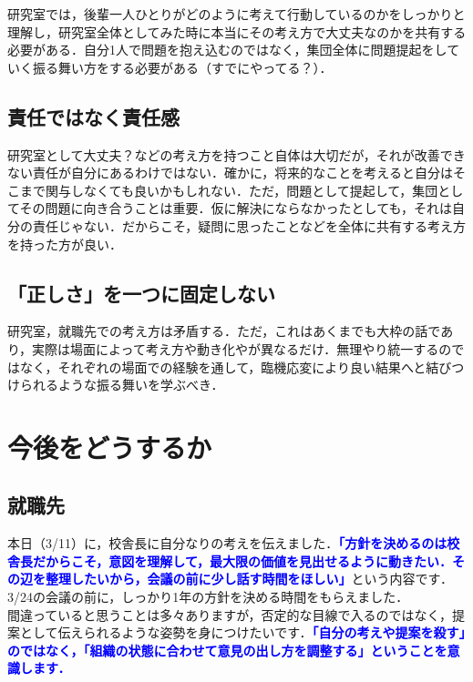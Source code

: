 \documentclass[a4paper,12pt]{ltjsarticle}
\newcommand{\important}[1]{\textcolor{blue}{\textbf{#1}}}
\begin{document}
研究室では，後輩一人ひとりがどのように考えて行動しているのかをしっかりと理解し，研究室全体としてみた時に本当にその考え方で大丈夫なのかを共有する必要がある．自分1人で問題を抱え込むのではなく，集団全体に問題提起をしていく振る舞い方をする必要がある（すでにやってる？）．

\subsection{責任ではなく責任感}

研究室として大丈夫？などの考え方を持つこと自体は大切だが，それが改善できない責任が自分にあるわけではない．確かに，将来的なことを考えると自分はそこまで関与しなくても良いかもしれない．ただ，問題として提起して，集団としてその問題に向き合うことは重要．仮に解決にならなかったとしても，それは自分の責任じゃない．だからこそ，疑問に思ったことなどを全体に共有する考え方を持った方が良い．

\subsection{「正しさ」を一つに固定しない}

研究室，就職先での考え方は矛盾する．ただ，これはあくまでも大枠の話であり，実際は場面によって考え方や動き化やが異なるだけ．無理やり統一するのではなく，それぞれの場面での経験を通して，臨機応変により良い結果へと結びつけられるような振る舞いを学ぶべき．
\newpage

\section{今後をどうするか}

\subsection{就職先}

本日（3/11）に，校舎長に自分なりの考えを伝えました．\important{「方針を決めるのは校舎長だからこそ，意図を理解して，最大限の価値を見出せるように動きたい．その辺を整理したいから，会議の前に少し話す時間をほしい」}という内容です．3/24の会議の前に，しっかり1年の方針を決める時間をもらえました．\\

間違っていると思うことは多々ありますが，否定的な目線で入るのではなく，提案として伝えられるような姿勢を身につけたいです．\important{「自分の考えや提案を殺す」のではなく，「組織の状態に合わせて意見の出し方を調整する」ということを意識します．}
\end{document}
